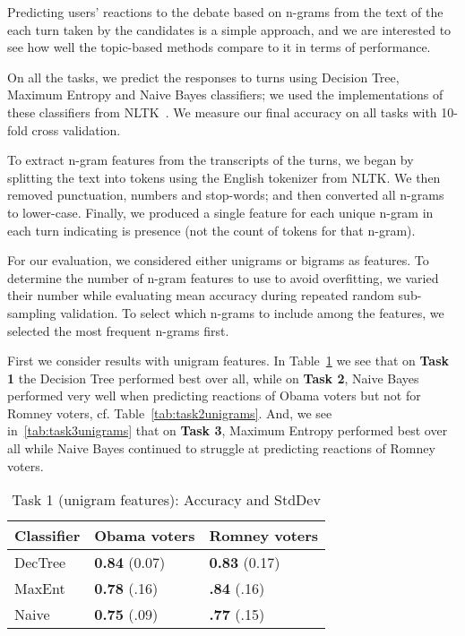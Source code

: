 
Predicting users' reactions to the debate based on n-grams from the text of the each turn taken by the candidates is a simple approach, and we are interested to see how well the topic-based methods compare to it in terms of performance.

On all the tasks, we predict the responses to turns using Decision Tree, Maximum Entropy and Naive Bayes classifiers; we used the implementations of these classifiers from NLTK~\cite{bird_nltk:_2006}.  We measure our final accuracy on all tasks with 10-fold cross validation.  

To extract n-gram features from the transcripts of the turns, we began by splitting the text into tokens using the English tokenizer from NLTK.  We then removed punctuation, numbers and stop-words; and then converted all n-grams to lower-case.  Finally, we produced a single feature for each unique n-gram in each turn indicating is presence (not the count of tokens for that n-gram).  

For our evaluation, we considered either unigrams or bigrams as features.  To determine the number of n-gram features to use to avoid overfitting, we varied their number while evaluating mean accuracy during repeated random sub-sampling validation.  To select which n-grams to include among the features, we selected the most frequent n-grams first.

First we consider results with unigram features. In Table~\ref{tab:task1unigrams} we see that on \textbf{Task 1} the Decision Tree performed best over all, while on \textbf{Task 2}, Naive Bayes performed very well when predicting reactions of Obama voters but not for Romney voters, cf. Table~\ref{tab:task2unigrams}.  And, we see in~\ref{tab:task3unigrams} that on \textbf{Task 3}, Maximum Entropy performed best over all while Naive Bayes continued to struggle at predicting reactions of Romney voters.

\begin{table}[H]
\begin{centering}
\begin{tabular}{ l | l | l }
Classifier & Obama voters & Romney voters \\
\hline
DecTree & \textbf{0.84} (0.07) &  \textbf{0.83} (0.17) \\
MaxEnt & \textbf{0.78} (.16) &  \textbf{.84} (.16) \\
Naive & \textbf{0.75} (.09) &  \textbf{.77} (.15) \\
\end{tabular}
\caption{Task 1 (unigram features): Accuracy and StdDev}
\label{tab:task1unigrams}
\end{centering}
\end{table}

